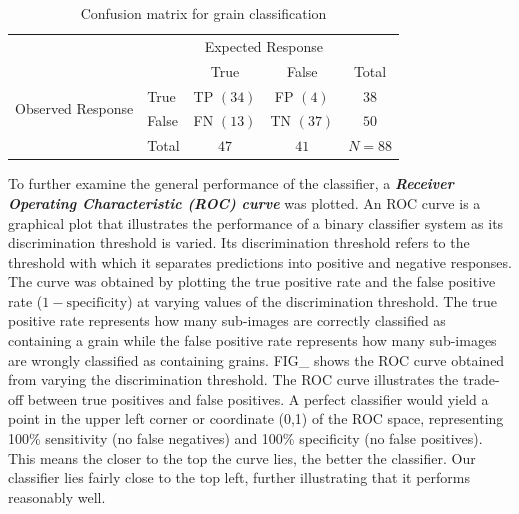 \begin{table}[ht!]
\begin{center}
    \begin{tabular}{l|l|c|c|c}
    \multicolumn{2}{c}{}&\multicolumn{2}{c}{Expected Response}&\\
    \cline{3-4}
    \multicolumn{2}{c|}{}&True&False&\multicolumn{1}{c}{Total}\\
    \cline{2-4}
    \multirow{2}{*}{Observed Response}& True & \cellcolor{green!25}TP $(34)$ & FP $(4)$ & $38$\\
    \cline{2-4}
    & False & FN $(13)$ & \cellcolor{green!25}TN $(37)$ & $50$\\
    \cline{2-4}
    \multicolumn{1}{c}{} & \multicolumn{1}{c}{Total} & \multicolumn{1}{c}{$47$} & \multicolumn{1}{c}{$41$} & \multicolumn{1}{c}{$N = 88$}\\
    \end{tabular}
\end{center}
\caption{Confusion matrix for grain classification}
\end{table}
To further examine the general performance of the classifier, a \textit{\textbf{Receiver Operating Characteristic (ROC) curve}} was plotted. An ROC curve is a graphical plot that illustrates the performance of a binary classifier system as its discrimination threshold is varied. Its discrimination threshold refers to the threshold with which it separates predictions into positive and negative responses. The curve was obtained by plotting the true positive rate and the false positive rate ($1 - \text{specificity}$) at varying values of the discrimination threshold. The true positive rate represents how many sub-images are correctly classified as containing a grain while the false positive rate represents how many sub-images are wrongly classified as containing grains. FIG\_ shows the ROC curve obtained from varying the discrimination threshold. The ROC curve illustrates the trade-off between true positives and false positives. A perfect classifier would yield a point in the upper left corner or coordinate (0,1) of the ROC space, representing 100\% sensitivity (no false negatives) and 100\% specificity (no false positives). This means the closer to the top the curve lies, the better the classifier. Our classifier lies fairly close to the top left, further illustrating that it performs reasonably well.
